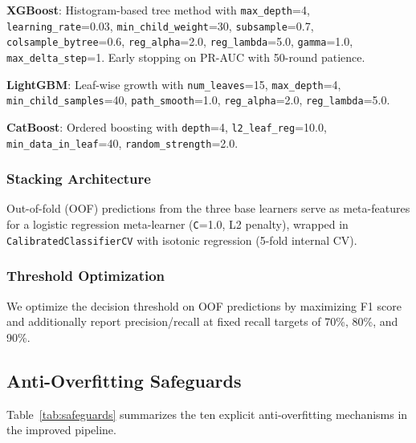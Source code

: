 \documentclass[conference]{IEEEtran}
\begin{document}
\textbf{XGBoost}: Histogram-based tree method with \texttt{max\_depth}=4, \texttt{learning\_rate}=0.03, \texttt{min\_child\_weight}=30, \texttt{subsample}=0.7, \texttt{colsample\_bytree}=0.6, \texttt{reg\_alpha}=2.0, \texttt{reg\_lambda}=5.0, \texttt{gamma}=1.0, \texttt{max\_delta\_step}=1. Early stopping on PR-AUC with 50-round patience.

\textbf{LightGBM}: Leaf-wise growth with \texttt{num\_leaves}=15, \texttt{max\_depth}=4, \texttt{min\_child\_samples}=40, \texttt{path\_smooth}=1.0, \texttt{reg\_alpha}=2.0, \texttt{reg\_lambda}=5.0.

\textbf{CatBoost}: Ordered boosting with \texttt{depth}=4, \texttt{l2\_leaf\_reg}=10.0, \texttt{min\_data\_in\_leaf}=40, \texttt{random\_strength}=2.0.

\subsubsection{Stacking Architecture}
Out-of-fold (OOF) predictions from the three base learners serve as meta-features for a logistic regression meta-learner (\texttt{C}=1.0, L2 penalty), wrapped in \texttt{CalibratedClassifierCV} with isotonic regression (5-fold internal CV).

\subsubsection{Threshold Optimization}
We optimize the decision threshold on OOF predictions by maximizing F1 score and additionally report precision/recall at fixed recall targets of 70\%, 80\%, and 90\%.

\subsection{Anti-Overfitting Safeguards}

Table~\ref{tab:safeguards} summarizes the ten explicit anti-overfitting mechanisms in the improved pipeline.
\end{document}
